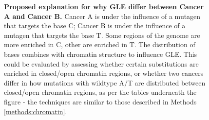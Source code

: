 \begin{figure}[h!]
  \begin{minipage}[c]{\textwidth}
    \caption{
      \textbf{Proposed explanation for why GLE differ between Cancer A and Cancer B.} Cancer A is under the influence of a mutagen that targets the base C; Cancer B is under the influence of a mutagen that targets the base T. Some regions of the genome are more enriched in C, other are enriched in T. The distribution of bases combines with chromatin structure to influence GLE. This could be evaluated by assessing whether certain substitutions are enriched in closed/open chromatin regions, or whether two cancers differ in how mutations with wildtype A/T are distributed between closed/open chromatin regions, as per the tables underneath the figure - the techniques are similar to those described in Methods \ref{methods:chromatin}.
    } \label{fig:discussion_gle}
  \end{minipage}
\end{figure}
